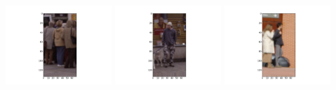 \includegraphics[width=4cm]{dbshow-0-7.png} 
\includegraphics[width=4cm]{dbshow-0-8.png} 
\includegraphics[width=4cm]{dbshow-0-9.png} 
